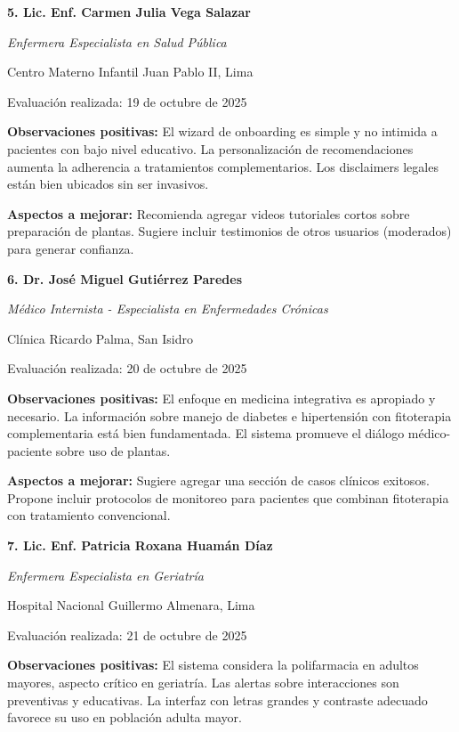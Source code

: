 \documentclass[12pt,a4paper]{article}
\begin{document}
\vspace{0.3cm}

\textbf{5. Lic. Enf. Carmen Julia Vega Salazar}

\textit{Enfermera Especialista en Salud Pública}

Centro Materno Infantil Juan Pablo II, Lima

Evaluación realizada: 19 de octubre de 2025

\textbf{Observaciones positivas:} El wizard de onboarding es simple y no intimida a pacientes con bajo nivel educativo. La personalización de recomendaciones aumenta la adherencia a tratamientos complementarios. Los disclaimers legales están bien ubicados sin ser invasivos.

\textbf{Aspectos a mejorar:} Recomienda agregar videos tutoriales cortos sobre preparación de plantas. Sugiere incluir testimonios de otros usuarios (moderados) para generar confianza.

\vspace{0.3cm}

\textbf{6. Dr. José Miguel Gutiérrez Paredes}

\textit{Médico Internista - Especialista en Enfermedades Crónicas}

Clínica Ricardo Palma, San Isidro

Evaluación realizada: 20 de octubre de 2025

\textbf{Observaciones positivas:} El enfoque en medicina integrativa es apropiado y necesario. La información sobre manejo de diabetes e hipertensión con fitoterapia complementaria está bien fundamentada. El sistema promueve el diálogo médico-paciente sobre uso de plantas.

\textbf{Aspectos a mejorar:} Sugiere agregar una sección de casos clínicos exitosos. Propone incluir protocolos de monitoreo para pacientes que combinan fitoterapia con tratamiento convencional.

\vspace{0.3cm}

\textbf{7. Lic. Enf. Patricia Roxana Huamán Díaz}

\textit{Enfermera Especialista en Geriatría}

Hospital Nacional Guillermo Almenara, Lima

Evaluación realizada: 21 de octubre de 2025

\textbf{Observaciones positivas:} El sistema considera la polifarmacia en adultos mayores, aspecto crítico en geriatría. Las alertas sobre interacciones son preventivas y educativas. La interfaz con letras grandes y contraste adecuado favorece su uso en población adulta mayor.
\end{document}
